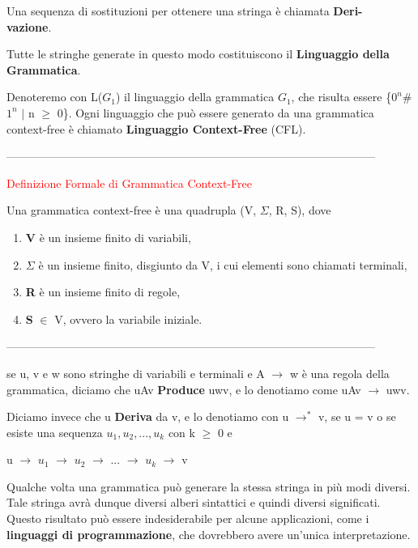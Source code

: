 \documentclass{article}
\begin{document}
Una sequenza di sostituzioni per ottenere una stringa è chiamata \textbf{Deri- \\ vazione}.

Tutte le stringhe generate in questo modo costituiscono il \textbf{Linguaggio della Grammatica}.

Denoteremo con L($G_1$) il linguaggio della grammatica $G_1$, che risulta essere \{$0^n$\#$1^n$ $|$ n $\geq$ 0\}. Ogni linguaggio che può essere generato da una grammatica context-free è chiamato \textbf{Linguaggio Context-Free} (CFL).

--------------------------------------------------------------------------------------------------

\begin{center}
    \textcolor{red}{Definizione Formale di Grammatica Context-Free}
\end{center}

Una grammatica context-free è una quadrupla (V, $\Sigma$, R, S), dove

\begin{enumerate}
    \item \textbf{V} è un insieme finito di variabili,
    \item \textbf{$\Sigma$} è un insieme finito, disgiunto da V, i cui elementi sono chiamati terminali,
    \item \textbf{R} è un insieme finito di regole,
    \item \textbf{S} $\in$ V, ovvero la variabile iniziale.
\end{enumerate}

--------------------------------------------------------------------------------------------------

se u, v e w sono stringhe di variabili e terminali e A $\rightarrow$ w è una regola della grammatica, diciamo che uAv \textbf{Produce} uwv, e lo denotiamo come uAv $\rightarrow$ uwv. 

Diciamo invece che u \textbf{Deriva} da v, e lo denotiamo con u $\rightarrow^*$ v, se u = v o se esiste una sequenza $u_1,u_2,...,u_k$ con k $\geq$ 0 e

\begin{center}
    u $\rightarrow$ $u_1$ $\rightarrow$ $u_2$ $\rightarrow$ ... $\rightarrow$ $u_k$ $\rightarrow$ v
\end{center}

Qualche volta una grammatica può generare la stessa stringa in più modi diversi. Tale stringa avrà dunque diversi alberi sintattici e quindi diversi significati. Questo risultato può essere indesiderabile per alcune applicazioni, come i \textbf{linguaggi di programmazione}, che dovrebbero avere un'unica interpretazione. 
\end{document}
